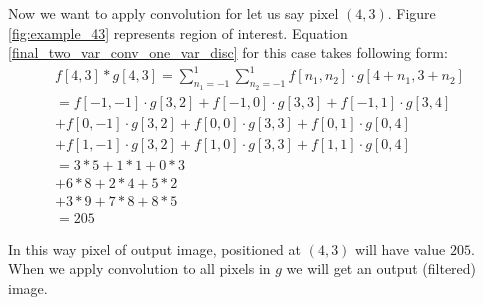 \documentclass{article}
\begin{document}
\begin{description}
Now we want to apply convolution for let us say pixel $(4,3)$. Figure \ref{fig:example_43} represents region of interest. Equation \ref{final_two_var_conv_one_var_disc} for this case takes following form:
\begin{equation} 
\begin{split}
f[4,3] * g[4,3] =\sum_{n_{1}=-1}^{1} \sum_{n_{2}=-1}^{1} f[n_{1}, n_{2}] \cdot g[4+n_{1}, 3 + n_{2}] \\
= f[-1, -1] \cdot g[3, 2] + f[-1, 0] \cdot g[3, 3] + f[-1, 1] \cdot g[3, 4] \\
+ f[0, -1] \cdot g[3, 2] + f[0, 0] \cdot g[3, 3] + f[0, 1] \cdot g[0, 4] \\
+ f[1, -1] \cdot g[3, 2] + f[1, 0] \cdot g[3, 3] + f[1, 1] \cdot g[0, 4] \\
= 3 * 5 + 1 * 1 + 0 * 3 \\
+ 6 * 8 + 2 * 4 + 5 * 2 \\
+ 3 * 9 + 7 * 8 + 8 * 5 \\
= 205
\end{split}
\end{equation}

In this way pixel of output image, positioned at $(4,3)$ will have value $205$. When we apply convolution to all pixels in $g$ we will get an output (filtered) image.


\end{description}
\end{document}
